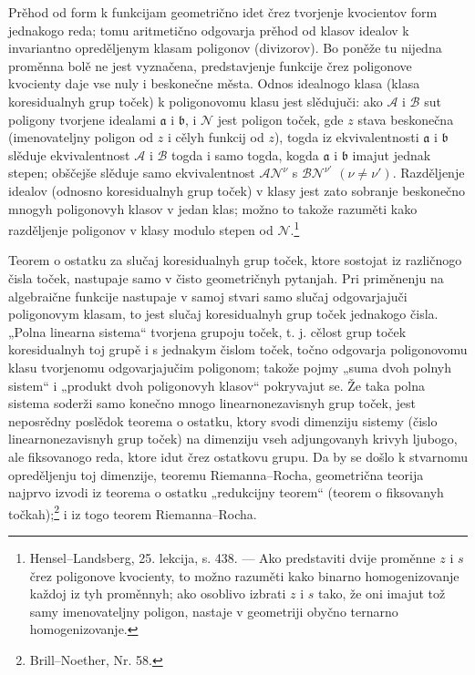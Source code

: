 \documentclass[11pt]{article}
\providecommand{\fra}{\mathfrak a}
\providecommand{\frb}{\mathfrak b}
\providecommand{\calA}{\mathcal A}
\providecommand{\calB}{\mathcal B}
\providecommand{\calN}{\mathcal N}
\begin{document}
Prěhod od form k funkcijam geometrično idet črez tvorjenje kvocientov form jednakogo reda; tomu aritmetično odgovarja prěhod od klasov idealov k invariantno opreděljenym klasam poligonov (divizorov). Bo poněže tu nijedna proměnna bolě ne jest vyznačena, predstavjenje funkcije črez poligonove kvocienty daje vse nuly i beskonečne města. Odnos idealnogo klasa (klasa koresidualnyh grup toček) k poligonovomu klasu jest slědujuči: ako \(\calA\) i \(\calB\) sut poligony tvorjene idealami \(\fra\) i \(\frb\), i \(\calN\) jest poligon toček, gde \(z\) stava beskonečna (imenovateljny poligon od \(z\) i cělyh funkcij od \(z\)), togda iz ekvivalentnosti \(\fra\) i \(\frb\) slěduje ekvivalentnost \(\calA\) i \(\calB\) togda i samo togda, kogda \(\fra\) i \(\frb\) imajut jednak stepen; obščejše slěduje samo ekvivalentnost \(\calA\calN^\nu\) s \(\calB\calN^{\nu'}\) \((\nu\ne\nu')\). Razděljenje idealov (odnosno koresidualnyh grup toček) v klasy jest zato sobranje beskonečno mnogyh poligonovyh klasov v jedan klas; možno to takože razuměti kako razděljenje poligonov v klasy modulo stepen od \(\calN\).\footnote{Hensel--Landsberg, 25. lekcija, s. 438. --- Ako predstaviti dvije proměnne \(z\) i \(s\) črez poligonove kvocienty, to možno razuměti kako binarno homogenizovanje každoj iz tyh proměnnyh; ako osoblivo izbrati \(z\) i \(s\) tako, že oni imajut tož samy imenovateljny poligon, nastaje v geometriji obyčno ternarno homogenizovanje.}

Teorem o ostatku za slučaj koresidualnyh grup toček, ktore sostojat iz različnogo čisla toček, nastupaje samo v čisto geometričnyh pytanjah. Pri priměnenju na algebraične funkcije nastupaje v samoj stvari samo slučaj odgovarjajuči poligonovym klasam, to jest slučaj koresidualnyh grup toček jednakogo čisla. „Polna linearna sistema“ tvorjena grupoju toček, t. j. cělost grup toček koresidualnyh toj grupě i s jednakym čislom toček, točno odgovarja poligonovomu klasu tvorjenomu odgovarjajučim poligonom; takože pojmy „suma dvoh polnyh sistem“ i „produkt dvoh poligonovyh klasov“ pokryvajut se. Že taka polna sistema soderži samo konečno mnogo linearnonezavisnyh grup toček, jest neposrědny poslědok teorema o ostatku, ktory svodi dimenziju sistemy (čislo linearnonezavisnyh grup toček) na dimenziju vseh adjungovanyh krivyh ljubogo, ale fiksovanogo reda, ktore idut črez ostatkovu grupu. Da by se došlo k stvarnomu opreděljenju toj dimenzije, teoremu Riemanna--Rocha, geometrična teorija najprvo izvodi iz teorema o ostatku „redukcijny teorem“ (teorem o fiksovanyh točkah);\footnote{Brill--Noether, Nr. 58.} i iz togo teorem Riemanna--Rocha.
\end{document}
